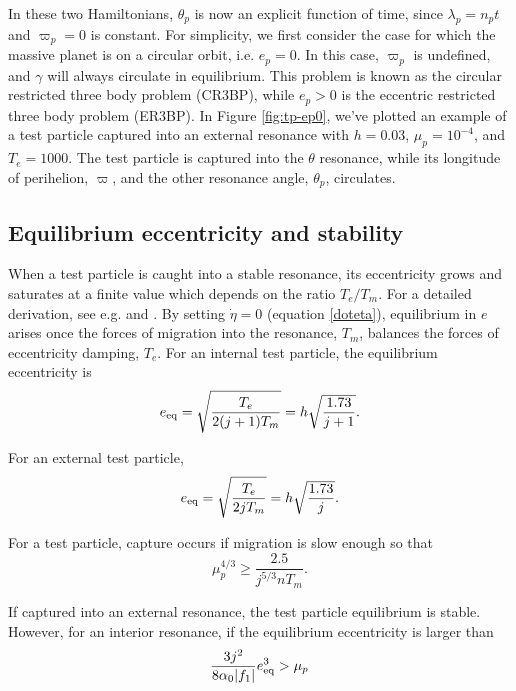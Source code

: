 \documentclass[usenatbib,twocolumn]{mnras}
\DeclarePairedDelimiter{\abs}{|}{|}
\begin{document}
In these two Hamiltonians, \(\theta_p\) is now an explicit function of
time, since \(\lambda_p=n_p t\) and \(\varpi_p=0\) is constant.  For
simplicity, we first consider the case for which the massive planet is
on a circular orbit, i.e. \(e_p=0\).
In this case, \(\varpi_p\) is undefined, and \(\gamma\) will
always circulate in equilibrium.
This problem is known as the circular restricted three
body problem (CR3BP), while \(e_p>0\) is the eccentric restricted three
body problem (ER3BP).  In Figure \ref{fig:tp-ep0}, we've plotted an
example of a test particle captured into an external resonance with
\(h=0.03\), \(\mu_p = 10^{-4}\), and \(T_{e} = 1000\).  The test particle is
captured into the \(\theta\) resonance, while its longitude of
perihelion, \(\varpi\), and the other resonance angle, \(\theta_p\),
circulates.

\subsection{Equilibrium eccentricity and stability}
\label{sec:org6fc184c}
When a test particle is caught into a stable resonance, its
eccentricity grows and saturates at a finite value which depends on
the ratio \(T_{e}/T_{m}\).  For a detailed derivation, see e.g.
\citep{goldreich_overstable_2014} and \citep{xu_migration_2018}.
By setting \(\dot\eta=0\) (equation \ref{doteta}), equilibrium
in \(e\) arises once the forces of migration into the resonance, \(T_m\), balances
the forces of eccentricity damping, \(T_e\). For an internal
test particle, the equilibrium eccentricity is
\begin{equation}
\label{eq:eeqint}
  e_{\rm eq} = \sqrt{\frac{T_e}{2(j+1)T_m}} = h\sqrt{\frac{1.73}{j+1}}.
\end{equation}

\noindent
For an external test particle,
\begin{equation}
\label{eq:eeqext}
  e_{\rm eq} = \sqrt{\frac{T_e}{2jT_m}} = h\sqrt{\frac{1.73}{j}}.
\end{equation}

For a test particle, capture occurs if migration is slow enough so that
\citep{goldreich_overstable_2014}
\begin{equation}
\mu_p^{4/3} \geq \frac{2.5}{j^{5/3}n T_m}.
\end{equation}

\noindent
If captured into an external resonance, the test particle equilibrium
is stable. However, for an interior resonance, if the equilibrium
eccentricity is larger than
\begin{equation}
  \frac{3j^2}{8\alpha_0 \abs{f_1}}e_{\rm eq}^3 > \mu_p
\end{equation}
\end{document}
